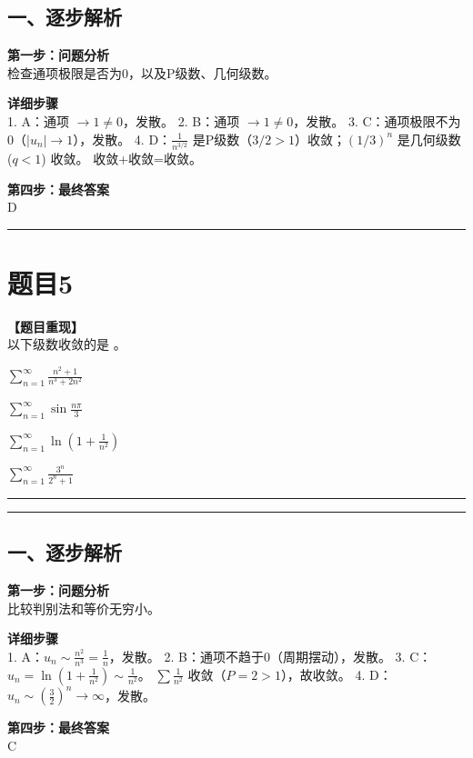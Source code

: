 \documentclass[12pt, a4paper]{ctexart}
\newcommand{\TopSeparator}{
    \par\noindent\rule{\textwidth}{1.5pt}\vspace{0.5em} %
}
\newcommand{\AnalysisSeparator}{
    \par\noindent\rule{\textwidth}{0.5pt}\vspace{0.2em}\hrule\vspace{0.5em} %
}
\newenvironment{RedAnalysis}{
    \par
    \color{red} %
}{
    \par
    \color{black} %
}
\newcommand{\choicesTwo}[4]{
    \begin{enumerate}[label=\Alph*., itemsep=0pt, parsep=0pt, topsep=5pt, labelsep=0.5em]
        \begin{minipage}{0.45\linewidth} \item #1 \end{minipage}
        \begin{minipage}{0.45\linewidth} \item #2 \end{minipage}
        \begin{minipage}{0.45\linewidth} \item #3 \end{minipage}
        \begin{minipage}{0.45\linewidth} \item #4 \end{minipage}
    \end{enumerate}
}
\begin{document}
\begin{RedAnalysis}

\subsection*{一、逐步解析}

\textbf{第一步：问题分析} \\
检查通项极限是否为0，以及P级数、几何级数。

\textbf{详细步骤} \\
1. A：通项 $\to 1 \neq 0$，发散。
2. B：通项 $\to 1 \neq 0$，发散。
3. C：通项极限不为0（$|u_n| \to 1$），发散。
4. D：$\frac{1}{n^{3/2}}$ 是P级数（$3/2 > 1$）收敛；$(1/3)^n$ 是几何级数 ($q<1$) 收敛。
   收敛+收敛=收敛。

\textbf{第四步：最终答案} \\
D

\end{RedAnalysis}

\vspace{2em}

\TopSeparator
\section*{题目5}

\textbf{【题目重现】} \\
以下级数收敛的是 \underline{\hspace{1cm}}。
\choicesTwo
{$ \sum_{n=1}^{\infty}\frac{n^{2}+1}{n^{3}+2n^{2}} $}
{$ \sum_{n=1}^{\infty}\sin\frac{n\pi}{3} $}
{$ \sum_{n=1}^{\infty}\ln\left(1+\frac{1}{n^{2}}\right) $}
{$ \sum_{n=1}^{\infty}\frac{3^{n}}{2^{n}+1} $}

\AnalysisSeparator

\begin{RedAnalysis}

\subsection*{一、逐步解析}

\textbf{第一步：问题分析} \\
比较判别法和等价无穷小。

\textbf{详细步骤} \\
1. A：$u_n \sim \frac{n^2}{n^3} = \frac{1}{n}$，发散。
2. B：通项不趋于0（周期摆动），发散。
3. C：$u_n = \ln(1 + \frac{1}{n^2}) \sim \frac{1}{n^2}$。
   $\sum \frac{1}{n^2}$ 收敛（$P=2>1$），故收敛。
4. D：$u_n \sim (\frac{3}{2})^n \to \infty$，发散。

\textbf{第四步：最终答案} \\
C

\end{RedAnalysis}
\end{document}
